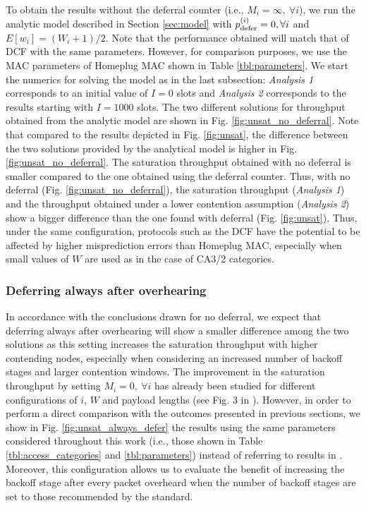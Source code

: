 \documentclass[preprint,12pt]{elsarticle}
\begin{document}
To obtain the results without the deferral counter (i.e., $M_i = \infty,~ \forall i$), we run the analytic model described in Section \ref{sec:model} with $p_{\rm defer}^{(i)} = 0, \forall i$ and $E[w_i] = (W_i+1)/2$. Note that the performance obtained will match that of DCF with the same parameters. However, for comparison purposes, we use the MAC parameters of Homeplug MAC shown in Table \ref{tbl:parameters}. We start the numerics for solving the model as in the last subsection: \emph{Analysis 1} corresponds to an initial value of $I = 0$ slots and \emph{Analysis 2} corresponds to the results starting with $I=1000$ slots. The two different solutions for throughput obtained from the analytic model are shown in Fig. \ref{fig:unsat_no_deferral}. Note that compared to the results depicted in Fig. \ref{fig:unsat}, the difference between the two solutions provided by the analytical model is higher in Fig. \ref{fig:unsat_no_deferral}. The saturation throughput obtained with no deferral is smaller compared to the one obtained using the deferral counter. Thus, with no deferral (Fig. \ref{fig:unsat_no_deferral}), the saturation throughput (\emph{Analysis 1}) and the throughput obtained under a lower contention assumption (\emph{Analysis 2}) show a bigger difference than the one found with deferral (Fig. \ref{fig:unsat}). Thus, under the same configuration, protocols such as the DCF have the potential to be affected by higher misprediction errors than Homeplug MAC, especially when small values of $W$ are used as 
in the case of CA3/2 categories. 

\subsubsection{Deferring always after overhearing }

In accordance with the conclusions drawn for no deferral, we expect that deferring always after overhearing will show a smaller difference among the two solutions as this setting increases the saturation throughput with higher contending nodes, especially when considering an increased number of backoff stages and larger contention windows. The improvement in the saturation throughput by setting $M_i=0,~ \forall i$ has already been studied for different configurations of $i$, $W$ and payload lengths (see Fig. 3 in \cite{campista2005improving}). However, in order to perform a direct comparison with the outcomes presented in previous sections, we show in Fig. \ref{fig:unsat_always_defer} the results using the same parameters considered throughout this work (i.e., those shown in Table \ref{tbl:access_categories} and \ref{tbl:parameters}) instead of referring to results in \cite{campista2005improving}. Moreover, this configuration allows us to evaluate the benefit of increasing the backoff stage after every packet overheard when the number of backoff stages are set to those recommended by the standard.
\end{document}
